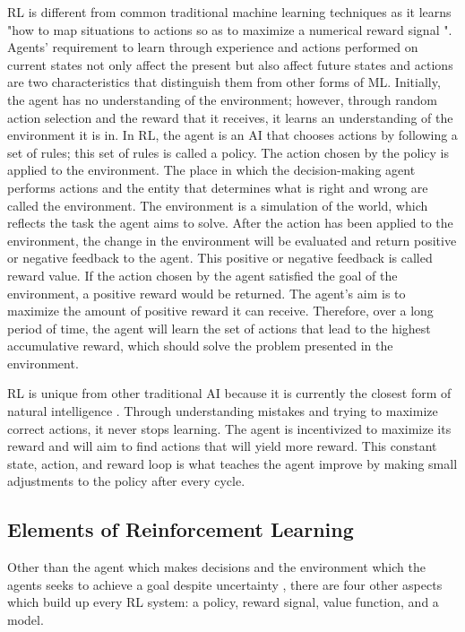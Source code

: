 RL is different from common traditional machine learning techniques as it learns "how to map situations to actions so as to maximize a numerical reward signal \cite{Sutton1}". Agents' requirement to learn through experience and actions performed on current states not only affect the present but also affect future states and actions are two characteristics that distinguish them from other forms of ML. Initially, the agent has no understanding of the environment; however, through random action selection and the reward that it receives, it learns an understanding of the environment it is in. In RL, the agent is an AI that chooses actions by following a set of rules; this set of rules is called a policy. The action chosen by the policy is applied to the environment. The place in which the decision-making agent performs actions and the entity that determines what is right and wrong are called the environment. The environment is a simulation of the world, which reflects the task the agent aims to solve. After the action has been applied to the environment, the change in the environment will be evaluated and return positive or negative feedback to the agent. This positive or negative feedback is called reward value. If the action chosen by the agent satisfied the goal of the environment, a positive reward would be returned. The agent’s aim is to maximize the amount of positive reward it can receive. Therefore, over a long period of time, the agent will learn the set of actions that lead to the highest accumulative reward, which should solve the problem presented in the environment. 

RL is unique from other traditional AI because it is currently the closest form of natural intelligence \cite{Sutton1}. Through understanding mistakes and trying to maximize correct actions, it never stops learning. The agent is incentivized to maximize its reward and will aim to find actions that will yield more reward. This constant state, action, and reward loop is what teaches the agent improve by making small adjustments to the policy after every cycle. 

\subsection{Elements of Reinforcement Learning}

Other than the agent which makes decisions and the environment which the agents seeks to achieve a goal despite uncertainty \cite{Sutton1}, there are four other aspects which build up every RL system: a policy, reward signal, value function, and a model.

